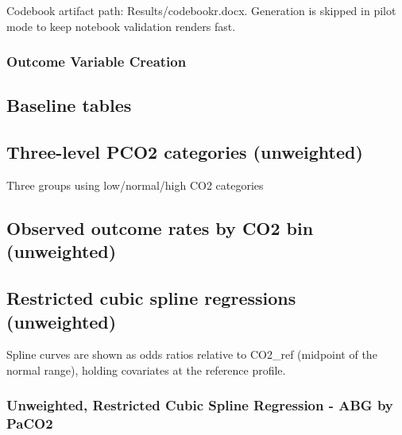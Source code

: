 \documentclass[
  11pt,
  letterpaper,
  DIV=11,
  numbers=noendperiod]{scrartcl}
\begin{document}
Codebook artifact path: Results/codebookr.docx. Generation is skipped in
pilot mode to keep notebook validation renders fast.

\subsubsection{Outcome Variable
Creation}\label{outcome-variable-creation}

\subsection{Baseline tables}\label{baseline-tables}

\FloatBarrier\nopagebreak

\par

\noindent

\FloatBarrier\nopagebreak

\par

\noindent

\FloatBarrier\nopagebreak

\par

\noindent

\subsection{Three-level PCO2 categories
(unweighted)}\label{three-level-pco2-categories-unweighted}

Three groups using low/normal/high CO2 categories

\subsection{Observed outcome rates by CO2 bin
(unweighted)}\label{observed-outcome-rates-by-co2-bin-unweighted}

\subsection{Restricted cubic spline regressions
(unweighted)}\label{restricted-cubic-spline-regressions-unweighted}

Spline curves are shown as odds ratios relative to CO2\_ref (midpoint of
the normal range), holding covariates at the reference profile.

\subsubsection{Unweighted, Restricted Cubic Spline Regression - ABG by
PaCO2}\label{unweighted-restricted-cubic-spline-regression---abg-by-paco2}
\end{document}

